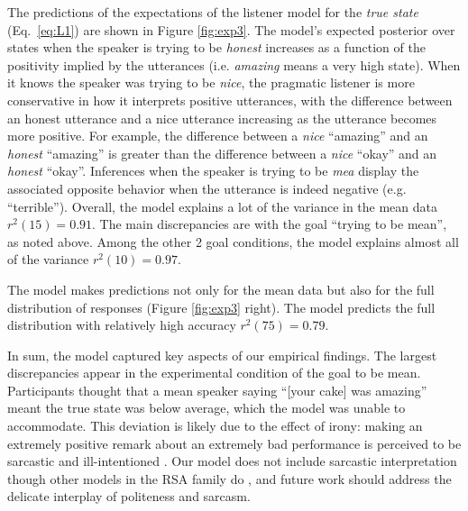 \documentclass[10pt,letterpaper]{article}
\newcommand{\ndg}[1]{\textcolor{Green}{[ndg: #1]}}
\newcommand{\mht}[1]{\textcolor{DarkOrange}{[mht: #1]}}
\begin{document}
The predictions of the expectations of the listener model for the \emph{true state} (Eq.~\ref{eq:L1}) are shown in Figure \ref{fig:exp3}.
The model's expected posterior over states when the speaker is trying to be \emph{honest} increases as a function of the positivity implied by the utterances (i.e. \emph{amazing} means a very high state).
When it knows the speaker was trying to be \emph{nice}, the pragmatic listener is more conservative in how it interprets positive utterances, with the difference between an honest utterance and a nice utterance increasing as the utterance becomes more positive. 
For example, the difference between a \emph{nice} ``amazing'' and an \emph{honest} ``amazing'' is greater than the difference between a \emph{nice} ``okay'' and an \emph{honest} ``okay''.
Inferences when the speaker is trying to be \emph{mea} display the associated opposite behavior when the utterance is indeed negative (e.g. ``terrible'').
Overall, the model explains a lot of the variance in the mean data $r^2(15) = 0.91$.
The main discrepancies are with the goal ``trying to be mean'', as noted above.
Among the other 2 goal conditions, the model explains almost all of the variance $r^2(10) = 0.97$.

The model makes predictions not only for the mean data but also for the full distribution of responses (Figure \ref{fig:exp3} right).
The model predicts the full distribution with relatively high accuracy $r^2(75) = 0.79$.

In sum, the model captured key aspects of our empirical findings.
The largest discrepancies appear in the experimental condition of the goal to be mean.
Participants thought that a mean speaker saying ``[your cake] was amazing'' meant the true state was below average, which the model was unable to accommodate.
This deviation is likely due to the effect of irony: making an extremely positive remark about an extremely bad performance is perceived to be sarcastic and ill-intentioned \cite{colston1997}.
Our model does not include sarcastic interpretation though other models in the RSA family do \cite{Kao2015}, and future work should address the delicate interplay of politeness and sarcasm.

\end{document}
